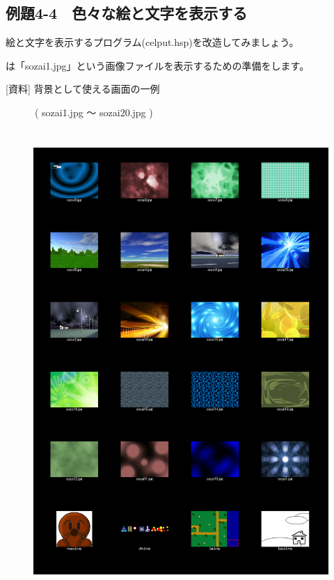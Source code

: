 \newpage
\subsection{例題4-4　色々な絵と文字を表示する}


\begin{description}
    \item {}
\end{description}

絵と文字を表示するプログラム(celput.hsp)を改造してみましょう。

\begin{description}
    \item {}
\end{description}


は「sozai1.jpg」という画像ファイルを表示するための準備をします。

[資料] 背景として使える画面の一例

　　　( sozai1.jpg 〜 sozai20.jpg )


\begin{figure}[H]
    \begin{center}
      \includegraphics[keepaspectratio,width=14.843cm,height=17.609cm]{text04-img/text04-img014.png}
    \end{center}
    \label{fig:prog_menu}
\end{figure}

